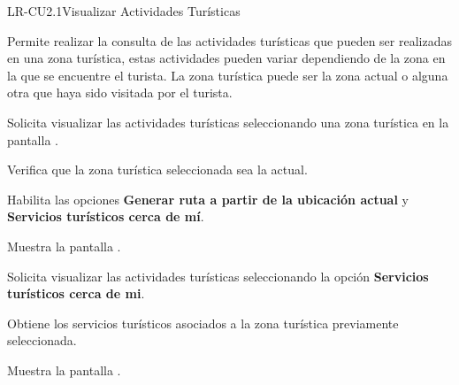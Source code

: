 
% 



	\begin{UseCase}{LR-CU2.1}{Visualizar Actividades Turísticas}{
		
		Permite realizar la consulta de las actividades turísticas que pueden ser realizadas en una zona turística, estas actividades pueden  variar dependiendo de la zona en la que se encuentre el turista. La zona turística puede ser la zona actual o alguna otra que haya sido visitada por el turista.\\
		
	}
	\end{UseCase}
	\begin{UCtrayectoria} 
		\UCpaso [\UCactor] Solicita visualizar las actividades turísticas seleccionando una zona turística en la pantalla .
		
		\UCpaso Verifica que la zona turística seleccionada sea la actual. 
		
		\UCpaso Habilita las opciones \textbf{Generar ruta a partir de la ubicación actual} y \textbf{Servicios turísticos cerca de mí}.
		
		\UCpaso \label{LR-CU2.1:Pantalla1} Muestra la pantalla .
		
		\UCpaso [\UCactor] Solicita visualizar las actividades turísticas seleccionando la opción \textbf{Servicios turísticos cerca de mi}. 
		
		\UCpaso Obtiene los servicios turísticos asociados a la zona turística previamente seleccionada.
		
		\UCpaso \label{LR-CU2.1:Pantalla} Muestra la pantalla .
		
	\end{UCtrayectoria}

